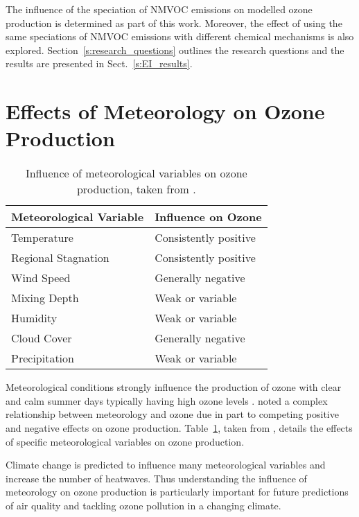 The influence of the speciation of NMVOC emissions on modelled ozone production is determined as part of this work.
Moreover, the effect of using the same speciations of NMVOC emissions with different chemical mechanisms is also explored.
Section~\ref{s:research_questions} outlines the research questions and the results are presented in Sect.~\ref{s:EI_results}.

\section{Effects of Meteorology on Ozone Production} \label{s:meteo_ozone}
\begin{table}
    \centering
    \caption[Influence of meteorological variables on ozone production]{Influence of meteorological variables on ozone production, taken from \citet{Jacob:2009}.}
    \begin{tabular}{ll}
        \hline \hline
        \textbf{Meteorological Variable} & \textbf{Influence on Ozone} \\
        \hline \hline
        Temperature & Consistently positive \\
        Regional Stagnation & Consistently positive \\
        Wind Speed & Generally negative \\
        Mixing Depth & Weak or variable \\
        Humidity & Weak or variable \\
        Cloud Cover & Generally negative \\
        Precipitation & Weak or variable \\
        \hline \hline
    \end{tabular}
    \label{t:meteo_vars}
\end{table}
Meteorological conditions strongly influence the production of ozone with clear and calm summer days typically having high ozone levels \citep{Duenas:2002}.
\citet{Comrie:1997} noted a complex relationship between meteorology and ozone due in part to competing positive and negative effects on ozone production.
Table~\ref{t:meteo_vars}, taken from \citet{Jacob:2009}, details the effects of specific meteorological variables on ozone production.

Climate change is predicted to influence many meteorological variables and increase the number of heatwaves.
Thus understanding the influence of meteorology on ozone production is particularly important for future predictions of air quality and tackling ozone pollution in a changing climate.

